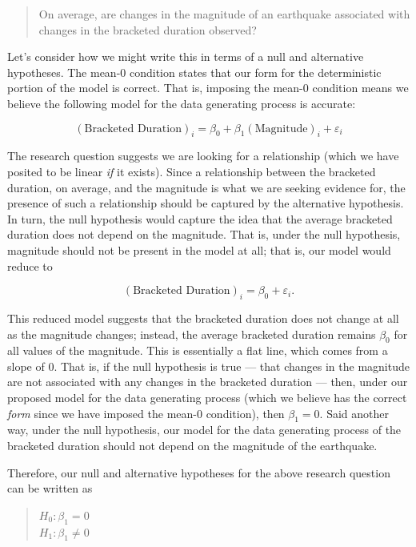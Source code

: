 \documentclass[
  letterpaper,
  DIV=11,
  numbers=noendperiod]{scrreprt}
\theoremstyle{plain}
\theoremstyle{definition}
\theoremstyle{definition}
\theoremstyle{remark}
\begin{document}
\begin{quote}
On average, are changes in the magnitude of an earthquake associated
with changes in the bracketed duration observed?
\end{quote}

Let's consider how we might write this in terms of a null and
alternative hypotheses. The mean-0 condition states that our form for
the deterministic portion of the model is correct. That is, imposing the
mean-0 condition means we believe the following model for the data
generating process is accurate:

\[(\text{Bracketed Duration})_i = \beta_0 + \beta_1(\text{Magnitude})_i + \varepsilon_i\]

The research question suggests we are looking for a relationship (which
we have posited to be linear \emph{if} it exists). Since a relationship
between the bracketed duration, on average, and the magnitude is what we
are seeking evidence for, the presence of such a relationship should be
captured by the alternative hypothesis. In turn, the null hypothesis
would capture the idea that the average bracketed duration does not
depend on the magnitude. That is, under the null hypothesis, magnitude
should not be present in the model at all; that is, our model would
reduce to

\[(\text{Bracketed Duration})_i = \beta_0 + \varepsilon_i.\]

This reduced model suggests that the bracketed duration does not change
at all as the magnitude changes; instead, the average bracketed duration
remains \(\beta_0\) for all values of the magnitude. This is essentially
a flat line, which comes from a slope of 0. That is, if the null
hypothesis is true --- that changes in the magnitude are not associated
with any changes in the bracketed duration --- then, under our proposed
model for the data generating process (which we believe has the correct
\emph{form} since we have imposed the mean-0 condition), then
\(\beta_1 = 0\). Said another way, under the null hypothesis, our model
for the data generating process of the bracketed duration should not
depend on the magnitude of the earthquake.

Therefore, our null and alternative hypotheses for the above research
question can be written as

\begin{quote}
\(H_0: \beta_1 = 0\)\\
\(H_1: \beta_1 \neq 0\)
\end{quote}
\end{document}
